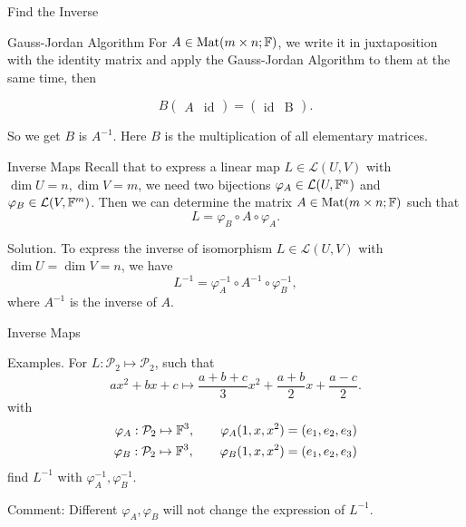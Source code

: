 \documentclass[hyperref={pdfpagelabels=true}]{beamer}
\renewcommand{\L}{\mathcal{L}}
\newcommand{\Mat}{\text{Mat}}
\newcommand{\<}{\langle}
\renewcommand{\>}{\rangle}
\begin{document}
\begin{frame}{Find the Inverse}
    \begin{block}{Gauss-Jordan Algorithm}
        For $A \in \Mat(m \times n;\F)$, we write it in juxtaposition with the identity matrix and apply the Gauss-Jordan Algorithm to them at the same time, then 
        \begin{spacing}{0.7}
        \[B
        \begin{pmatrix}
            A & \text{id} 
        \end{pmatrix}
        = 
        \begin{pmatrix}
           \text{id} & \text{B} 
        \end{pmatrix}.
        \]
    \end{spacing}
        So we get $B$ is $A^{-1}$.
        Here $B$ is the multiplication of all elementary matrices.
    \end{block}
\end{frame}
\begin{frame}{Inverse Maps}
    Recall that to express a linear map $L \in \L(U,V)$ with $\dim U = n,\dim V = m$, we need two bijections $\varphi_{A} \in \L(U,\F^{n})$ and $\varphi_{B} \in \L(V,\F^{m})$. Then we can determine the matrix $A \in \Mat(m \times n;\F)$ such that 
    \[L = \varphi_{B} \circ A \circ \varphi_{A}.\]
    \begin{block}{Solution.}
        To express the inverse of isomorphism $L \in \L(U,V)$ with $\dim U = \dim V = n$, we have 
        \[L^{-1} = \varphi_{A}^{-1} \circ A^{-1} \circ \varphi_{B}^{-1},\]
        where $A^{-1}$ is the inverse of $A$.
    \end{block}
\end{frame}
\begin{frame}{Inverse Maps}
    \begin{block}{Examples.}
        For $L:\mathcal{P}_{2} \mapsto \mathcal{P}_{2}$, such that 
        \[ax^{2}+bx+c \mapsto \frac{a+b+c}{3}x^{2}+\frac{a+b}{2}x+\frac{a-c}{2}.\]
        with
        \[
            \begin{aligned}
                \varphi_{A}:\mathcal{P}_{2} \mapsto \mathbb{F}^{3}, \qquad \varphi_{A}(1,x,x^{2}) = (e_{1},e_{2},e_{3})\\
                \varphi_{B}:\mathcal{P}_{2} \mapsto \mathbb{F}^{3}, \qquad \varphi_{B}(1,x,x^{2}) = (e_{1},e_{2},e_{3})
            \end{aligned} 
        \]
        find $L^{-1}$ with $\varphi_{A}^{-1},\varphi_{B}^{-1}$.
    \end{block}
    \begin{block}{Comment:}
        Different $\varphi_{A},\varphi_{B}$ will not change the expression of $L^{-1}$.
    \end{block}
\end{frame} 
\end{document}
